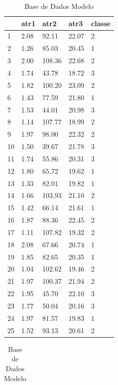 \begin{table}[!ht]
\centering
\caption{Base de Dados Modelo}
\label{tab:bdm}
\begin{tabular}{|lllll|}
\hline 
  & atr1 & atr2 & atr3 & classe \\ \hline
1 & 2.08 & 92.11 & 22.07 & 2 \\ \hline
2 & 1.26 & 85.03 & 20.45 & 1 \\ \hline
3 & 2.00 & 108.36 & 22.68 & 2 \\ \hline
4 & 1.74 & 43.78 & 18.72 & 3 \\ \hline
5 & 1.82 & 100.20 & 23.09 & 2 \\ \hline
6 & 1.43 & 77.59 & 21.80 & 1 \\ \hline
7 & 1.53 & 44.01 & 20.98 & 3 \\ \hline
8 & 1.14 & 107.77 & 18.99 & 2 \\ \hline
9 & 1.97 & 98.00 & 22.32 & 2 \\ \hline
10 & 1.50 & 39.67 & 21.78 & 3 \\ \hline
11 & 1.74 & 55.86 & 20.31 & 3 \\ \hline
12 & 1.80 & 65.72 & 19.62 & 1 \\ \hline
13 & 1.33 & 82.01 & 19.82 & 1 \\ \hline
14 & 1.66 & 103.93 & 21.10 & 2 \\ \hline
15 & 1.42 & 66.14 & 21.61 & 1 \\ \hline
16 & 1.87 & 88.36 & 22.45 & 2 \\ \hline
17 & 1.11 & 107.82 & 19.32 & 2 \\ \hline
18 & 2.08 & 67.66 & 20.74 & 1 \\ \hline
19 & 1.85 & 82.65 & 20.35 & 1 \\ \hline
20 & 1.04 & 102.62 & 19.46 & 2 \\ \hline
21 & 1.97 & 100.37 & 21.94 & 2 \\ \hline
22 & 1.95 & 45.70 & 22.10 & 3 \\ \hline
23 & 1.77 & 50.04 & 20.16 & 3 \\ \hline
24 & 1.97 & 81.57 & 19.83 & 1 \\ \hline
25 & 1.52 & 93.13 & 20.61 & 2 \\ \hline
  \end{tabular}
  \begin{tabular}{ |lllll| }
   

\end{tabular}
\end{table}
